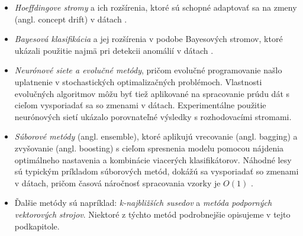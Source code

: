 \begin{itemize}
	\item \textit{Hoeffdingove stromy} a ich rozšírenia, ktoré sú schopné adaptovať sa na zmeny (angl. concept drift) v dátach \citep{hulten2001mining, bifet2009adaptive}.
	\item \textit{Bayesová klasifikácia} a jej rozšírenia v podobe Bayesových stromov, ktoré ukázali použitie najmä pri detekcii anomálií v dátach \citep{hill2007real}.
	\item \textit{Neurónové siete a evolučné metódy}, pričom evolučné programovanie našlo uplatnenie v stochastických optimalizačných problémoch. Vlastnosti evolučných algoritmov môžu byť tiež aplikované na spracovanie prúdu dát s cieľom vysporiadať sa so zmenami v dátach. Experimentálne použitie neurónových sietí ukázalo porovnateľné výsledky s rozhodovacími stromami.
	\item \textit{Súborové metódy} (angl. ensemble), ktoré aplikujú vrecovanie (angl. bagging) a zvyšovanie (angl. boosting) s cieľom spresnenia modelu pomocou nájdenia optimálneho nastavenia a kombinácie viacerých klasifikátorov. Náhodné lesy sú typickým príkladom súborových metód, dokážú sa vysporiadať so zmenami v dátach, pričom časová náročnosť spracovania vzorky je $O(1)$ \citep{abdulsalam2011classification}.
	\item Ďalšie metódy sú napríklad: \textit{k-najbližších susedov} a \textit{metóda podporných vektorových strojov}. Niektoré z týchto metód podrobnejšie opisujeme v tejto podkapitole.
\end{itemize}

